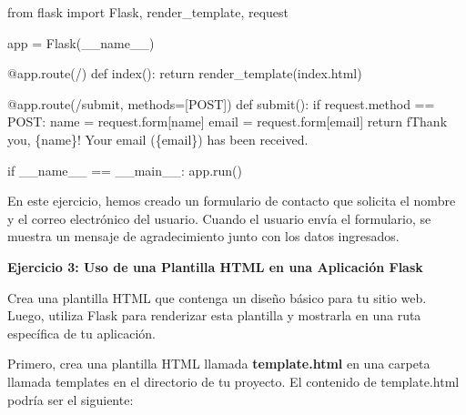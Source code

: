 \documentclass[
  a4paper,
  DIV=11,
  numbers=noendperiod,
  onepage,
  openany]{scrreprt}
\newenvironment{Shaded}{\begin{snugshade}}{\end{snugshade}}
\newcommand{\AttributeTok}[1]{\textcolor[rgb]{0.40,0.45,0.13}{#1}}
\newcommand{\ControlFlowTok}[1]{\textcolor[rgb]{0.00,0.23,0.31}{#1}}
\newcommand{\ImportTok}[1]{\textcolor[rgb]{0.00,0.46,0.62}{#1}}
\newcommand{\KeywordTok}[1]{\textcolor[rgb]{0.00,0.23,0.31}{#1}}
\newcommand{\NormalTok}[1]{\textcolor[rgb]{0.00,0.23,0.31}{#1}}
\newcommand{\OperatorTok}[1]{\textcolor[rgb]{0.37,0.37,0.37}{#1}}
\newcommand{\SpecialCharTok}[1]{\textcolor[rgb]{0.37,0.37,0.37}{#1}}
\newcommand{\SpecialStringTok}[1]{\textcolor[rgb]{0.13,0.47,0.30}{#1}}
\newcommand{\StringTok}[1]{\textcolor[rgb]{0.13,0.47,0.30}{#1}}
\newcommand{\VariableTok}[1]{\textcolor[rgb]{0.07,0.07,0.07}{#1}}
\begin{document}
\begin{Shaded}
\begin{Highlighting}[]
\ImportTok{from}\NormalTok{ flask }\ImportTok{import}\NormalTok{ Flask, render\_template, request}

\NormalTok{app }\OperatorTok{=}\NormalTok{ Flask(}\VariableTok{\_\_name\_\_}\NormalTok{)}

\AttributeTok{@app.route}\NormalTok{(}\StringTok{\textquotesingle{}/\textquotesingle{}}\NormalTok{)}
\KeywordTok{def}\NormalTok{ index():}
    \ControlFlowTok{return}\NormalTok{ render\_template(}\StringTok{\textquotesingle{}index.html\textquotesingle{}}\NormalTok{)}

\AttributeTok{@app.route}\NormalTok{(}\StringTok{\textquotesingle{}/submit\textquotesingle{}}\NormalTok{, methods}\OperatorTok{=}\NormalTok{[}\StringTok{\textquotesingle{}POST\textquotesingle{}}\NormalTok{])}
\KeywordTok{def}\NormalTok{ submit():}
    \ControlFlowTok{if}\NormalTok{ request.method }\OperatorTok{==} \StringTok{\textquotesingle{}POST\textquotesingle{}}\NormalTok{:}
\NormalTok{        name }\OperatorTok{=}\NormalTok{ request.form[}\StringTok{\textquotesingle{}name\textquotesingle{}}\NormalTok{]}
\NormalTok{        email }\OperatorTok{=}\NormalTok{ request.form[}\StringTok{\textquotesingle{}email\textquotesingle{}}\NormalTok{]}
        \ControlFlowTok{return} \SpecialStringTok{f\textquotesingle{}Thank you, }\SpecialCharTok{\{}\NormalTok{name}\SpecialCharTok{\}}\SpecialStringTok{! Your email (}\SpecialCharTok{\{}\NormalTok{email}\SpecialCharTok{\}}\SpecialStringTok{) has been received.\textquotesingle{}}

\ControlFlowTok{if} \VariableTok{\_\_name\_\_} \OperatorTok{==} \StringTok{\textquotesingle{}\_\_main\_\_\textquotesingle{}}\NormalTok{:}
\NormalTok{    app.run()}
\end{Highlighting}
\end{Shaded}

En este ejercicio, hemos creado un formulario de contacto que solicita
el nombre y el correo electrónico del usuario. Cuando el usuario envía
el formulario, se muestra un mensaje de agradecimiento junto con los
datos ingresados.

\textbf{Ejercicio 3: Uso de una Plantilla HTML en una Aplicación Flask}

Crea una plantilla HTML que contenga un diseño básico para tu sitio web.
Luego, utiliza Flask para renderizar esta plantilla y mostrarla en una
ruta específica de tu aplicación.

Primero, crea una plantilla HTML llamada \textbf{template.html} en una
carpeta llamada templates en el directorio de tu proyecto. El contenido
de template.html podría ser el siguiente:
\end{document}
